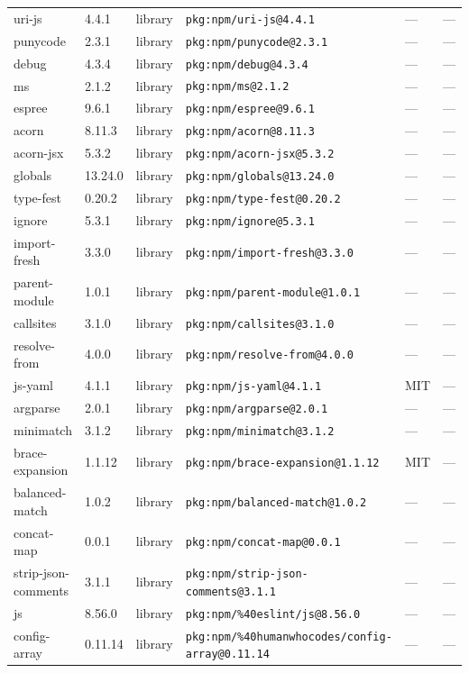 \documentclass[11pt]{article}
\begin{document}
\begin{longtable}{|l|l|l|p{2.2cm}|l|p{4cm}|}
uri-js & 4.4.1 & library & \texttt{pkg:npm/uri-js@4.4.1} & — & — \\
punycode & 2.3.1 & library & \texttt{pkg:npm/punycode@2.3.1} & — & — \\
debug & 4.3.4 & library & \texttt{pkg:npm/debug@4.3.4} & — & — \\
ms & 2.1.2 & library & \texttt{pkg:npm/ms@2.1.2} & — & — \\
espree & 9.6.1 & library & \texttt{pkg:npm/espree@9.6.1} & — & — \\
acorn & 8.11.3 & library & \texttt{pkg:npm/acorn@8.11.3} & — & — \\
acorn-jsx & 5.3.2 & library & \texttt{pkg:npm/acorn-jsx@5.3.2} & — & — \\
globals & 13.24.0 & library & \texttt{pkg:npm/globals@13.24.0} & — & — \\
type-fest & 0.20.2 & library & \texttt{pkg:npm/type-fest@0.20.2} & — & — \\
ignore & 5.3.1 & library & \texttt{pkg:npm/ignore@5.3.1} & — & — \\
import-fresh & 3.3.0 & library & \texttt{pkg:npm/import-fresh@3.3.0} & — & — \\
parent-module & 1.0.1 & library & \texttt{pkg:npm/parent-module@1.0.1} & — & — \\
callsites & 3.1.0 & library & \texttt{pkg:npm/callsites@3.1.0} & — & — \\
resolve-from & 4.0.0 & library & \texttt{pkg:npm/resolve-from@4.0.0} & — & — \\
js-yaml & 4.1.1 & library & \texttt{pkg:npm/js-yaml@4.1.1} & MIT & — \\
argparse & 2.0.1 & library & \texttt{pkg:npm/argparse@2.0.1} & — & — \\
minimatch & 3.1.2 & library & \texttt{pkg:npm/minimatch@3.1.2} & — & — \\
brace-expansion & 1.1.12 & library & \texttt{pkg:npm/brace-expansion@1.1.12} & MIT & — \\
balanced-match & 1.0.2 & library & \texttt{pkg:npm/balanced-match@1.0.2} & — & — \\
concat-map & 0.0.1 & library & \texttt{pkg:npm/concat-map@0.0.1} & — & — \\
strip-json-comments & 3.1.1 & library & \texttt{pkg:npm/strip-json-comments@3.1.1} & — & — \\
js & 8.56.0 & library & \texttt{pkg:npm/\%40eslint/js@8.56.0} & — & — \\
config-array & 0.11.14 & library & \texttt{pkg:npm/\%40humanwhocodes/config-array@0.11.14} & — & — \\

\end{longtable}
\end{document}
